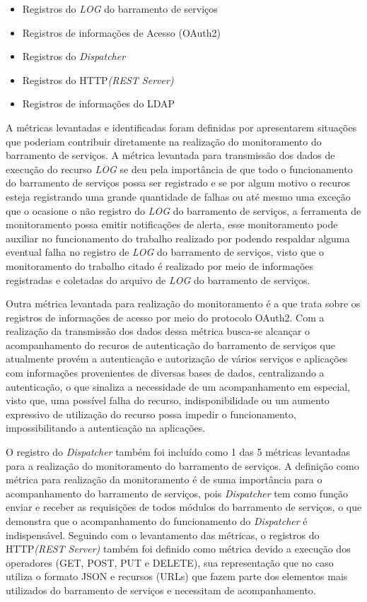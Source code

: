 {\begin{itemize}
    \item Registros do \textit{LOG} do barramento de serviços
    \item Registros de informações de Acesso (OAuth2)
    \item Registros do \textit{Dispatcher}
    \item Registros do HTTP\textit{(REST Server)}
    \item Registros de informações do LDAP
\end{itemize}

A métricas levantadas e identificadas foram definidas por apresentarem situações que poderiam contribuir diretamente na realização do monitoramento do barramento de serviços. A métrica levantada para transmissão dos dados de execução do recurso \textit{LOG} se deu pela importância de que todo o funcionamento do barramento de serviços possa ser registrado e se por algum motivo o recuros esteja registrando uma grande quantidade de falhas ou até mesmo uma exceção que o ocasione o não registro do \textit{LOG} do barramento de serviços, a ferramenta de monitoramento possa emitir notificações de alerta, esse monitoramento pode auxiliar no funcionamento do trabalho realizado por \cite{filgueirasmonitoramento} podendo respaldar alguma eventual falha no registro de \textit{LOG} do barramento de serviços, visto que o monitoramento do trabalho citado é realizado por meio de informações registradas e coletadas do arquivo de \textit{LOG} do barramento de serviços. 

Outra métrica levantada para realização do monitoramento é a que trata sobre os registros de informações de acesso por meio do protocolo OAuth2. Com a realização da transmissão dos dados dessa métrica busca-se alcançar o acompanhamento do recuros de autenticação do barramento de serviços que atualmente provém a autenticação e autorização de vários serviços e aplicações com informações provenientes de diversas bases de dados, centralizando a autenticação, o que sinaliza a necessidade de um acompanhamento em especial, visto que, uma possível falha do recurso, indisponibilidade ou um aumento expressivo de utilização do recurso possa impedir o funcionamento, impossibilitando a autenticação na aplicações. 

O registro do \textit{Dispatcher} também foi incluído como  1 das 5 métricas levantadas para a realização do monitoramento do barramento de serviços. A definição como métrica para realização da monitoramento é de suma importância para o acompanhamento do barramento de serviços, pois \textit{Dispatcher} tem como função enviar e receber as requisições de todos módulos do barramento de serviços, o que demonstra que o acompanhamento do funcionamento do \textit{Dispatcher} é indispensável. Seguindo com o levantamento das métricas, o registros do HTTP\textit{(REST Server)} também foi definido como métrica devido a execução dos operadores (GET, POST, PUT e DELETE), sua representação que no caso utiliza o formato \acrshort{JSON} e recursos (URLs) que fazem parte dos elementos mais utilizados do barramento de serviços e necessitam de acompanhamento.

}
